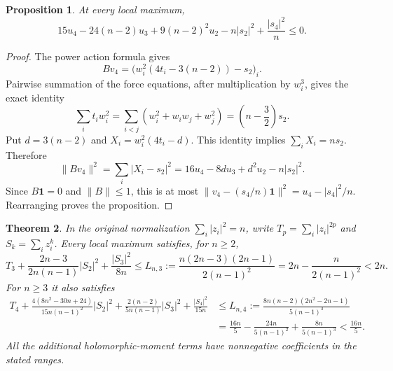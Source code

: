 \documentclass[11pt]{article}
\newtheorem{theorem}{Theorem}[section]
\newtheorem{proposition}[theorem]{Proposition}
\theoremstyle{remark}
\numberwithin{equation}{section}
\begin{document}
\begin{proposition}\label{prop:eighth-radial-cut}
At every local maximum,
\begin{equation}\label{eq:eighth-force-cut}
 15u_4-24(n-2)u_3+9(n-2)^2u_2-n|s_2|^2
       +\frac{|s_4|^2}{n}\le0.
\end{equation}
\end{proposition}

\begin{proof}
The power action formula gives
\[
 Bv_4=\bigl(w_i^2(4t_i-3(n-2))-s_2\bigr)_i.
\]
Pairwise summation of the force equations, after multiplication by
$w_i^3$, gives the exact identity
\[
 \sum_i t_iw_i^2
 =\sum_{i<j}(w_i^2+w_iw_j+w_j^2)
 =\left(n-\frac32\right)s_2.
\]
Put $d=3(n-2)$ and $X_i=w_i^2(4t_i-d)$.  This identity implies
$\sum_iX_i=ns_2$.  Therefore
\[
 \|Bv_4\|^2
 =\sum_i|X_i-s_2|^2
 =16u_4-8du_3+d^2u_2-n|s_2|^2.
\]
Since $B\mathbf1=0$ and $\|B\|\le1$, this is at most
$\|v_4-(s_4/n)\mathbf1\|^2=u_4-|s_4|^2/n$.
Rearranging proves the proposition.
\end{proof}

\begin{theorem}\label{thm:combined-higher-radial}
In the original normalization $\sum_i|z_i|^2=n$, write
$T_p=\sum_i|z_i|^{2p}$ and $S_k=\sum_i z_i^k$.
Every local maximum satisfies, for $n\ge2$,
\begin{equation}\label{eq:combined-sixth-radial}
 T_3+\frac{2n-3}{2n(n-1)}|S_2|^2+\frac{|S_3|^2}{8n}
 \le L_{n,3}:=\frac{n(2n-3)(2n-1)}{2(n-1)^2}
 =2n-\frac{n}{2(n-1)^2}<2n.
\end{equation}
For $n\ge3$ it also satisfies
\begin{equation}\label{eq:combined-eighth-radial}
 \begin{split}
 T_4+\frac{4(8n^2-30n+24)}{15n(n-1)^2}|S_2|^2
       +\frac{2(n-2)}{5n(n-1)}|S_3|^2
       +\frac{|S_4|^2}{15n}
 &\le L_{n,4}:=
       \frac{8n(n-2)(2n^2-2n-1)}{5(n-1)^3}\\
 &=\frac{16n}{5}-\frac{24n}{5(n-1)^2}
                    +\frac{8n}{5(n-1)^3}<\frac{16n}{5}.
 \end{split}
\end{equation}
All the additional holomorphic-moment terms have nonnegative
coefficients in the stated ranges.
\end{theorem}
\end{document}
